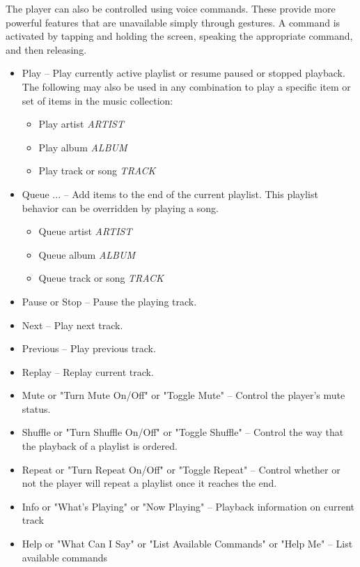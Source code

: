 \documentclass[12pt,letterpaper]{article}
\begin{document}
The player can also be controlled using voice commands. These provide more powerful features that are unavailable simply through gestures. A command is activated by tapping and holding the screen, speaking the appropriate command, and then releasing.

\begin{itemize}
\item Play -- Play currently active playlist or resume paused or stopped playback. \\ The following may also be used in any combination to play a specific item or set of items in the music collection:
	\begin{itemize}
	\item Play artist \textit{ARTIST}
	\item Play album \textit{ALBUM}
	\item Play track or song \textit{TRACK}
	\end{itemize}
\item Queue ... -- Add items to the end of the current playlist. This playlist behavior can be overridden by playing a song.
	\begin{itemize}
	\item Queue artist \textit{ARTIST}
	\item Queue album \textit{ALBUM}
	\item Queue track or song \textit{TRACK}
	\end{itemize}
\item Pause or Stop -- Pause the playing track.
\item Next -- Play next track.
\item Previous -- Play previous track.
\item Replay -- Replay current track.
\item Mute or "Turn Mute On/Off" or "Toggle Mute" -- Control the player's mute status.
\item {\color{red}Shuffle or "Turn Shuffle On/Off" or "Toggle Shuffle" -- Control the way that the playback of a playlist is ordered.}
\item {\color{red}Repeat or "Turn Repeat On/Off" or "Toggle Repeat" -- Control whether or not the player will repeat a playlist once it reaches the end.}
\item Info or "What's Playing" or "Now Playing" -- Playback information on current track
\item Help or "What Can I Say" or "List Available Commands" or "Help Me" -- List available commands

\end{itemize}
\end{document}
